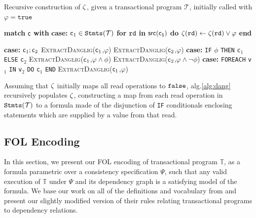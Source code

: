\begin{algorithm}
\caption{Recursive construction of $\mathtt{\zeta}$, given a transactional program $\mathcal{T}$, initially called with 
$\varphi = \texttt{true} $} \label{alg:dang} 

\begin{algorithmic}[1]
\State \textbf{match} $\mathsf{c}$ \textbf{with}
\State \indent \textbf{case:} $\mathsf{c}_1 \in \mathtt{Stmts}(\mathcal{T})$ 
\State \indent \indent \textbf{for} $\texttt{rd}$ \textbf{in} $\mathsf{src(\mathsf{c}_1)}$ \textbf{do}
\State \indent \indent \indent $\mathtt{\zeta}(\texttt{rd})\gets \mathtt{\zeta}(\texttt{rd}) \vee \varphi $
\State \indent \indent \textbf{end}

\State \indent \textbf{case:} $\mathsf{c}_1;\mathsf{c}_2$ 
\State \indent \indent \textsc{ExtractDanglig}($\mathsf{c}_1$,$\varphi$)
\State \indent \indent \textsc{ExtractDanglig}($\mathsf{c}_2$,$\varphi$)
\State \indent \textbf{case:} \texttt{IF} $\phi$ \texttt{THEN} \texttt{c}$_1$ \texttt{ELSE} \texttt{c}$_2$
\State \indent \indent \textsc{ExtractDanglig}($\mathsf{c}_1$,$\varphi \wedge \phi$)
\State \indent \indent \textsc{ExtractDanglig}($\mathsf{c}_2$,$\varphi \wedge \neg \phi$)
\State \indent \textbf{case:} \texttt{FOREACH} \texttt{v}$_1$ \texttt{IN} \texttt{v}$_2$ \texttt{DO} \texttt{c$_1$} \texttt{END}
\State \indent \indent \textsc{ExtractDanglig}($\mathsf{c}_1$,$\varphi$)


\EndProcedure
\end{algorithmic}
\end{algorithm}



Assuming that $\mathtt{\zeta}$ initially maps all read operations to $\mathtt{false}$,
alg.\ref{alg:dang} recursively populates $\mathtt{\zeta}$, constructing  a
map from each read operation in $\mathtt{Stmts}(\mathcal{T})$
to a formula made of the disjunction of \texttt{IF} conditionals enclosing
statements which are supplied by a value from that read.




\subsection{FOL Encoding}
In this section, we present our FOL encoding of transactional
program $\mathbb{T}$, as a formula parametric over a consistency specification $\Psi$, such
that any valid execution of $\mathbb{T}$ under $\Psi$ and its 
dependency graph is a satisfying model of the formula. We base our work on all of
the definitions and vocabulary from \cite{Nagar:ser} and present our slightly
modified version of their rules relating transactional programs to dependency
relations. 

